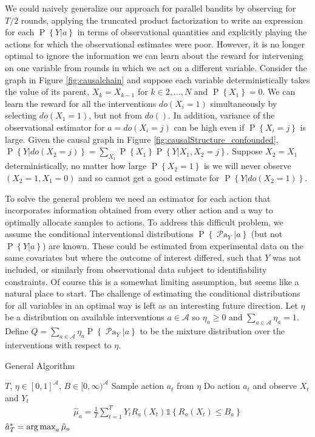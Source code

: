 \documentclass[11pt,a4paper,oneside]{book}
\newcommand{\calA}{\mathcal A}
\newcommand{\set}[1]{\left\{#1\right\}}
\newcommand{\ind}[1]{\mathds{1}\!\!\set{#1}}
\newcommand{\argmax}{\operatornamewithlimits{arg\,max}}
\newcommand{\eq}[1]{\begin{align*}#1\end{align*}}
\renewcommand{\P}[1]{\operatorname{P}\left\{#1\right\}}
\newcommand{\parents}[1]{\operatorname{\mathcal{P}a}_{#1}}
\begin{document}
We could naively generalize our approach for parallel bandits by observing for $T/2$ rounds, applying the truncated product factorization to 
write an expression for each $\P{Y|a}$ in terms of observational quantities and explicitly playing the actions for which the observational 
estimates were poor. However, it is no longer optimal to ignore the information we can learn about the reward for intervening on one variable 
from rounds in which we act on a different variable. Consider the graph in Figure \ref{fig:causalchain} and suppose each variable deterministically 
takes the value of its parent, $X_k = X_{k-1}$ for $k\in {2,\ldots,N}$ and $\P{X_1} = 0$. We can learn the reward for all the interventions $do(X_i = 1)$ 
simultaneously by selecting $do(X_1 = 1)$, but not from $do()$. In addition, variance of the observational estimator for $a = do(X_i = j)$ can be 
high even if $\P{X_i = j}$ is large. Given the causal graph in Figure \ref{fig:causalStructure_confounded}, $\P{Y|do(X_2= j)} = \sum_{X_1}\P{X_1}\P{Y|X_1, X_2 = j}$. 
Suppose $X_2 = X_1$ deterministically, no matter how large $\P{X_2 = 1}$ is we will never observe $(X_2=1,X_1 = 0)$ and so cannot 
get a good estimate for $\P{Y|do(X_2=1)}$. 

To solve the general problem we need an estimator for each action that incorporates information obtained from every other action and a way to optimally 
allocate samples to actions. To address this difficult problem, we assume the conditional interventional distributions $\P{\parents{Y}|a}$ (but not $\P{Y|a}$) 
are known. These could be estimated from experimental data on the same covariates but where the outcome of interest differed, such that $Y$ was not included, 
or similarly from observational data subject to identifiability constraints. Of course this is a somewhat limiting assumption, but seems like a natural place to
start. The challenge of estimating the conditional distributions for all variables in an optimal way is left as an interesting future direction.
Let $\eta$ be a distribution on available interventions $a \in \calA$ so $\eta_a \geq 0$ and $\sum_{a \in \calA} \eta_a = 1$. 
Define $Q = \sum_{a \in \calA} \eta_a \P{\parents{Y}|a}$ to be the mixture distribution over the interventions with respect to $\eta$.



\begin{algorithm}[H]
\caption{General Algorithm}\label{alg:general}
\begin{algorithmic}
 $T$, $\eta \in [0,1]^{\calA}$, $B \in [0,\infty)^{\calA}$
\FOR{$t \in \set{1,\ldots,T}$}
\STATE Sample action $a_t$ from $\eta$
\STATE Do action $a_t$ and observe $X_t$ and $Y_t$
\ENDFOR
\FOR{$a \in \calA$}
\STATE
\eq {
\hat \mu_a =  \frac{1}{T} \sum_{t=1}^T Y_t R_a(X_t)  \ind{R_a(X_t) \leq B_a}
}
\ENDFOR
{} $\hat a^*_T = \argmax_a \hat \mu_a$
\end{algorithmic}
\end{algorithm}
\end{document}
